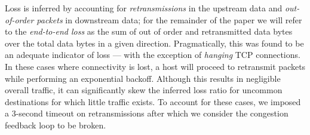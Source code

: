 
Loss is inferred by accounting for \emph{retransmissions} in the upstream data and \emph{out-of-order packets} in downstream data; for the remainder of the paper we will refer to the \emph{end-to-end loss} as the sum of out of order and retransmitted data bytes over the total data bytes in a given direction.
Pragmatically, this was found to be an adequate indicator of loss --- with the exception of \emph{hanging} \ac{TCP} connections. 
In these cases where connectivity is lost, a host will proceed to retransmit packets while performing an exponential backoff. 
Although this results in negligible overall traffic, it can significantly skew the inferred loss ratio for uncommon destinations for which little traffic exists. 
To account for these cases, we imposed a 3-second timeout on retransmissions after which we consider the congestion feedback loop to be broken. 

